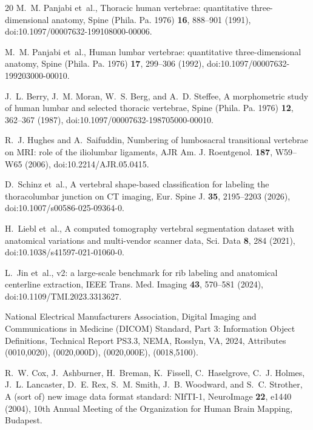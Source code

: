 \documentclass[aapm,mph,amsmath,amssymb,reprint]{revtex4-2}
\begin{document}
\begin{thebibliography}{20}
M.~M. Panjabi et~al.,
\newblock Thoracic human vertebrae: quantitative three-dimensional anatomy,
\newblock Spine (Phila. Pa. 1976) {\bf 16}, 888--901 (1991),
\newblock doi:10.1097/00007632-199108000-00006.

M.~M. Panjabi et~al.,
\newblock Human lumbar vertebrae: quantitative three-dimensional anatomy,
\newblock Spine (Phila. Pa. 1976) {\bf 17}, 299--306 (1992),
\newblock doi:10.1097/00007632-199203000-00010.

J.~L. Berry, J.~M. Moran, W.~S. Berg, and A.~D. Steffee,
\newblock A morphometric study of human lumbar and selected thoracic vertebrae,
\newblock Spine (Phila. Pa. 1976) {\bf 12}, 362--367 (1987),
\newblock doi:10.1097/00007632-198705000-00010.

R.~J. Hughes and A.~Saifuddin,
\newblock Numbering of lumbosacral transitional vertebrae on {MRI}: role of the iliolumbar ligaments,
\newblock AJR Am. J. Roentgenol. {\bf 187}, W59--W65 (2006),
\newblock doi:10.2214/AJR.05.0415.

D.~Schinz et~al.,
\newblock A vertebral shape-based classification for labeling the thoracolumbar junction on {CT} imaging,
\newblock Eur. Spine J. {\bf 35}, 2195--2203 (2026),
\newblock doi:10.1007/s00586-025-09364-0.

H.~Liebl et~al.,
\newblock A computed tomography vertebral segmentation dataset with anatomical variations and multi-vendor scanner data,
\newblock Sci. Data {\bf 8}, 284 (2021),
\newblock doi:10.1038/s41597-021-01060-0.

L.~Jin et~al.,
 v2: a large-scale benchmark for rib labeling and anatomical centerline extraction,
\newblock IEEE Trans. Med. Imaging {\bf 43}, 570--581 (2024),
\newblock doi:10.1109/TMI.2023.3313627.

{National Electrical Manufacturers Association},
\newblock Digital Imaging and Communications in Medicine ({DICOM}) Standard, Part 3: Information Object Definitions,
\newblock Technical Report PS3.3, NEMA, Rosslyn, VA, 2024,
\newblock Attributes (0010,0020), (0020,000D), (0020,000E), (0018,5100).

R.~W. Cox, J.~Ashburner, H.~Breman, K.~Fissell, C.~Haselgrove, C.~J. Holmes, J.~L. Lancaster, D.~E. Rex, S.~M. Smith, J.~B. Woodward, and S.~C. Strother,
\newblock A (sort of) new image data format standard: {NIfTI-1},
\newblock NeuroImage {\bf 22}, e1440 (2004),
\newblock 10th Annual Meeting of the Organization for Human Brain Mapping, Budapest.


\end{thebibliography}
\end{document}
